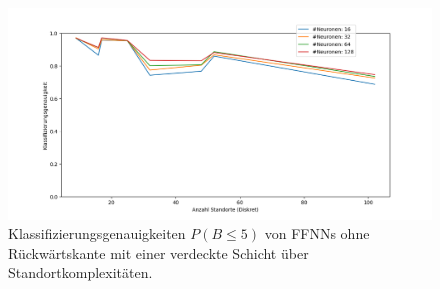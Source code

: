 \begin{figure}[h!]
    \centering
    \includegraphics[width=\linewidth]{images/multiple_best_by_group_knn_neurons_acc_5.png}
    \caption{Klassifizierungsgenauigkeiten $P(B\leq5)$ von FFNNs ohne Rückwärtskante mit einer verdeckte Schicht über Standortkomplexitäten.}
    \label{fig:multiple_best_by_group_knn_neurons_acc_5}
\end{figure}